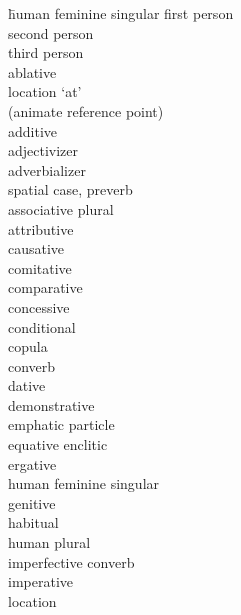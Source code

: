 
	\begin{multicols}{2}
    \largerpage[2]
		\begin{tabbing}
            \hspace{\tabcolsep}\= human feminine singular\kill
				\>	first person\\
				\>	second person\\
				\>	third person\\
				\>	ablative\\
			 \>	location `at' \\
			{}		\>	(animate reference point)\\
				\>	additive\\
				\>	adjectivizer\\
				\>	adverbializer\\
				\>	spatial case, preverb \\
				\>	associative plural\\
				\>	attributive\\
				\>	causative\\
				\>	comitative\\
				\>	comparative\\
				\>	concessive\\
				\>	conditional\\
				\>	copula\\
				\>	converb\\
				\>	dative\\
				\>	demonstrative\\
				\>	emphatic particle\\
				\>	equative enclitic\\
				\>	ergative\\
				\>	human feminine singular\\
				\>	genitive\\
				\>	habitual\\
				\>	human plural\\
				\>	imperfective converb\\
				\>	imperative\\
				\>	location \\

\end{tabbing}
\end{multicols}
